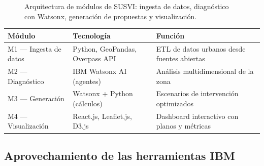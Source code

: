 \documentclass[12pt,a4paper]{article}
\begin{document}
\begin{figure}[H]
\centering

\caption{Arquitectura de módulos de SUSVI: ingesta de datos, diagnóstico con Watsonx, generación de propuestas y visualización.}
\label{fig:arquitectura}
\end{figure}
\begin{table}[H]
\centering
\small
\begin{tabularx}{\textwidth}{l l X}
\toprule
\textbf{Módulo} & \textbf{Tecnología} & \textbf{Función} \\
\midrule
M1 — Ingesta de datos & Python, GeoPandas, Overpass API & ETL de datos urbanos desde fuentes abiertas \\
M2 — Diagnóstico & IBM Watsonx AI (agentes) & Análisis multidimensional de la zona \\
M3 — Generación & Watsonx + Python (cálculos) & Escenarios de intervención optimizados \\
M4 — Visualización & React.js, Leaflet.js, D3.js & Dashboard interactivo con planos y métricas \\
\bottomrule
\end{tabularx}
\end{table}

\subsection{Aprovechamiento de las herramientas IBM}
\end{document}
